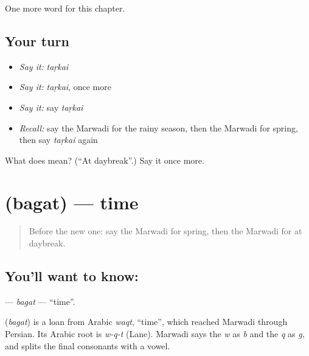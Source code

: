 \begin{grammarlens}[title={What you've built}]
One more word for this chapter.
\end{grammarlens}

\subsection*{Your turn}
\begin{itemize}
\raggedright
  \item \emph{Say it:} \emph{taṛkai}
  \item \emph{Say it:} \emph{taṛkai}, once more
  \item \emph{Say it:} say \emph{taṛkai}
  \item \emph{Recall:} say the Marwadi for the rainy season, then the Marwadi for spring, then say \emph{taṛkai} again
\end{itemize}

\begin{tcolorbox}[breakable,colback=teal!4,colframe=teal!35!black,title={Before you move on}]
What does  mean? (\textquotedblleft{}At daybreak\textquotedblright{}.) Say it once more.
\end{tcolorbox}
\section[\texorpdfstring{\mw{बगत} (bagat)}{बगत (bagat)}]{ (bagat) — time}

\label{lesson:MW-C95-bagat}



\begin{quote}
Before the new one: say the Marwadi for spring, then the Marwadi for at daybreak.
\end{quote}

\subsection*{You'll want to know: }
\textbf{} — \emph{bagat} — \textquotedblleft{}time\textquotedblright{}.

\begin{cousinweb}
\textbf{} (\emph{bagat}) is a loan from Arabic \emph{waqt}, \textquotedblleft{}time\textquotedblright{}, which reached Marwadi through Persian. Its Arabic root is \emph{w-q-t} (Lane). Marwadi says the \emph{w} as \emph{b} and the \emph{q} as \emph{g}, and splits the final consonants with a vowel.
\end{cousinweb}

